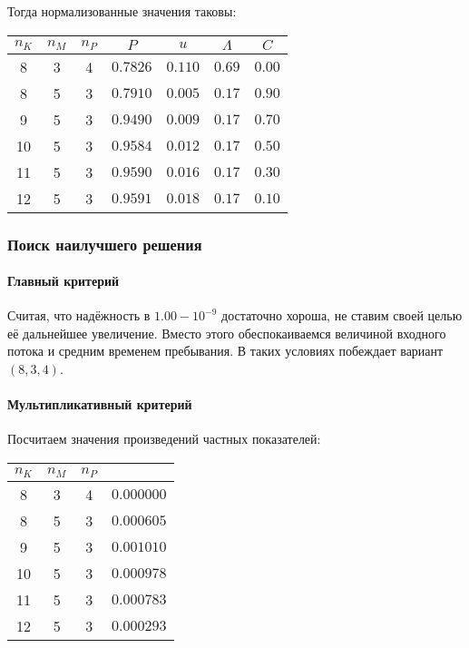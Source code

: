 \documentclass[12pt, a4paper] {ncc}
\begin{document}
Тогда нормализованные значения таковы:

\begin{tabular}{|c|c|c||c|c|c|c|}
\hline
$n_K$ & $n_M$ & $n_P$ & $P$      & $u$     & $\Lambda$ & $C$    \\ \hline
\hline
 8    &  3    &  4    & $0.7826$ & $0.110$ & $0.69$    & $0.00$ \\ \hline
 8    &  5    &  3    & $0.7910$ & $0.005$ & $0.17$    & $0.90$ \\ \hline
 9    &  5    &  3    & $0.9490$ & $0.009$ & $0.17$    & $0.70$ \\ \hline
10    &  5    &  3    & $0.9584$ & $0.012$ & $0.17$    & $0.50$ \\ \hline
11    &  5    &  3    & $0.9590$ & $0.016$ & $0.17$    & $0.30$ \\ \hline
12    &  5    &  3    & $0.9591$ & $0.018$ & $0.17$    & $0.10$ \\ \hline
\end{tabular}

\subsubsection*{Поиск наилучшего решения}

\paragraph{Главный критерий}

Считая, что надёжность в $1.00 - 10^{-9}$ достаточно хороша, не ставим своей
целью её дальнейшее увеличение. Вместо этого обеспокаиваемся величиной
входного потока и средним временем пребывания. В таких условиях побеждает
вариант $(8, 3, 4)$.

\paragraph{Мультипликативный критерий} Посчитаем значения произведений частных
показателей:

\begin{tabular}{|c|c|c||c|}
\hline
$n_K$ & $n_M$ & $n_P$ &          \\ \hline
\hline
 8    &  3    &  4    & $0.000000$ \\ \hline
 8    &  5    &  3    & $0.000605$ \\ \hline
 9    &  5    &  3    & $0.001010$ \\ \hline
10    &  5    &  3    & $0.000978$ \\ \hline
11    &  5    &  3    & $0.000783$ \\ \hline
12    &  5    &  3    & $0.000293$ \\ \hline
\end{tabular}
\end{document}
